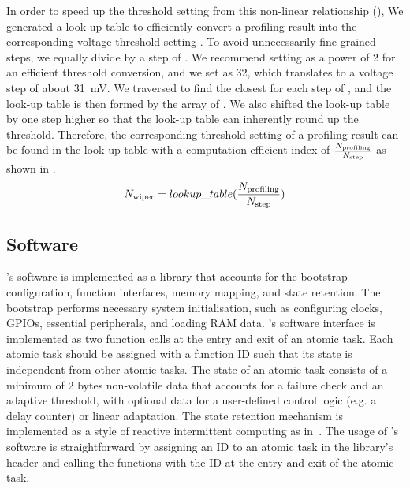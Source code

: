 In order to speed up the threshold setting from this non-linear relationship (), We generated a look-up table to efficiently convert a profiling result  into the corresponding voltage threshold setting . 
To avoid unnecessarily fine-grained steps, we equally divide  by a step of . We recommend setting  as a power of 2 for an efficient threshold conversion, and we set  as 32, which translates to a voltage step of about \SI{31}{\milli\volt}.
We traversed  to find the closest  for each step of , and the look-up table is then formed by the array of . 
We also shifted the look-up table by one step higher so that the look-up table can inherently round up the threshold. 
Therefore, the corresponding threshold setting  of a profiling result  can be found in the look-up table with a computation-efficient index of $\frac{N_{\text{profiling}}}{N_{\text{step}}}$ as shown in .
\begin{equation}
    N_{\text{wiper}} = lookup\_table(\frac{N_{\text{profiling}}}{N_{\text{step}}})
    \label{eq:n_wiper}
\end{equation}


\subsection{Software}

\nn{}'s software is implemented as a library that accounts for the bootstrap configuration, function interfaces, memory mapping, and state retention. 
The bootstrap performs necessary system initialisation, such as configuring clocks, GPIOs, essential peripherals, and loading RAM data. 
\nn{}'s software interface is implemented as two function calls at the entry and exit of an atomic task. 
Each atomic task should be assigned with a function ID such that its state is independent from other atomic tasks. 
The state of an atomic task consists of a minimum of 2 bytes non-volatile data that accounts for a failure check and an adaptive threshold, with optional data for a user-defined control logic (e.g. a delay counter) or linear adaptation. 
The state retention mechanism is implemented as a style of reactive intermittent computing as in~\cite{balsamo2015hibernus, jayakumar2014quickrecall}.
The usage of \nn{}'s software is straightforward by assigning an ID to an atomic task in the library's header and calling the functions with the ID at the entry and exit of the atomic task. 
